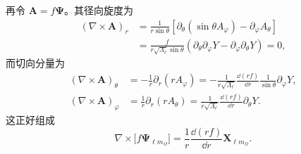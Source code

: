 再令 $\bm A=f\bm\Psi$。其径向旋度为
\begin{align}
(\nabla\times\bm A)_r
&=\frac{1}{r\sin\theta}
\left[\partial_\theta(\sin\theta A_\varphi)-\partial_\varphi A_\theta\right]\\
&=\frac{f}{r\sqrt{\Lambda_\ell}\sin\theta}
\left(\partial_\theta\partial_\varphi Y-\partial_\varphi\partial_\theta Y\right)=0,
\end{align}
而切向分量为
\begin{align}
(\nabla\times\bm A)_\theta
&=-\frac{1}{r}\partial_r(rA_\varphi)
=-\frac{1}{r\sqrt{\Lambda_\ell}}
\frac{\dd(rf)}{\dd r}\frac{1}{\sin\theta}\partial_\varphi Y,\\
(\nabla\times\bm A)_\varphi
&=\frac{1}{r}\partial_r(rA_\theta)
=\frac{1}{r\sqrt{\Lambda_\ell}}
\frac{\dd(rf)}{\dd r}\partial_\theta Y.
\end{align}
这正好组成
\begin{equation}
\nabla\times\bigl[f\bm\Psi_{\ell m_\Omega}\bigr]
=\frac{1}{r}\frac{\dd(rf)}{\dd r}\bm X_{\ell m_\Omega}.
\end{equation}

